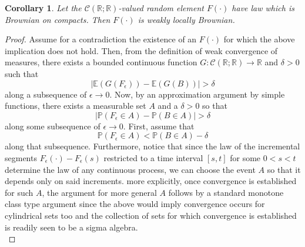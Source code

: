 \documentclass[12pt]{report}
\theoremstyle{plain}
\newtheorem{corollary}{Corollary}[section]
\newcommand{\R}{\ensuremath{\mathbb{R}}}
\newcommand{\PP}{\ensuremath{\mathbb{P}}}
\begin{document}
\begin{corollary}
\label{c:wlocalbrown} Let the $\mathcal{C}(\R;\R)$-valued random element $F(\cdot)$ have law which is Brownian on compacts. Then $F(\cdot)$ is weakly locally Brownian.
\end{corollary}%
\begin{proof} 
Assume for a contradiction the existence of an $F(\cdot)$ for which the above implication does not hold. Then, from the definition of weak convergence of measures, there exists a bounded continuous function $G:\mathcal{C}(\R;\R)\to \R$ and $\delta>0$ such that
\[
|\mathbb{E}(G(F_\epsilon))-\mathbb{E}(G(B))|>\delta
\]
along a subsequence of $\epsilon \to 0$. Now, by an approximation argument by simple functions, there exists a measurable set $A$ and a $\delta>0$ so that 
\[|\PP(F_\epsilon \in A)-\PP(B \in A)|>\delta\]
 along some subsequence of $\epsilon \to 0 $. First, assume that \[\PP(F_\epsilon\in A) < \PP(B\in A)-\delta\]
 along that subsequence. Furthermore, notice that since the law of the incremental segments $F_\epsilon(\cdot) - F_\epsilon(s)$ restricted to a time interval $[s,t]$ for some $0<s<t$ determine the law of any continuous process, we can choose the event $A$ so that it depends only on said increments. more explicitly, once convergence is established for such $A$, the argument for more general $A$ follows by a standard monotone class type argument since the above would imply convergence occurs for cylindrical sets too and the collection of sets for which convergence is established is readily seen to be a sigma algebra.\\


\end{proof}
\end{document}

